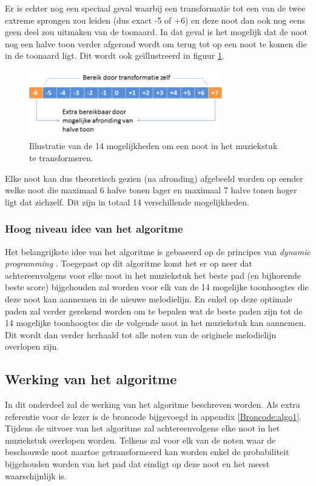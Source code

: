 Er is echter nog een speciaal geval waarbij een transformatie tot een van de twee extreme sprongen zou leiden (dus exact -5 of +6) en deze noot dan ook nog eens geen deel zou uitmaken van de toonaard. In dat geval is het mogelijk dat de noot nog een halve toon verder afgerond wordt om terug tot op een noot te komen die in de toonaard ligt. Dit wordt ook ge\"illustreerd in figuur \ref{figuur:14}.

\begin{figure}[!ht]
  \centering
  \includegraphics[width=0.75\textwidth]{4_Efficient_Toepassen_Transformatie/14}
  \caption{Illustratie van de 14 mogelijkheden om een noot in het muziekstuk te transformeren.}
  \label{figuur:14}
\end{figure}

Elke noot kan dus theoretisch gezien (na afronding) afgebeeld worden op eender welke noot die maximaal 6 halve tonen lager en maximaal 7 halve tonen hoger ligt dat zichzelf. Dit zijn in totaal 14 verschillende mogelijkheden.

\subsubsection{Hoog niveau idee van het algoritme}
Het belangrijkste idee van het algoritme is gebaseerd op de principes van \textit{dynamic programming} \cite{url:DP}. Toegepast op dit algoritme komt het er op neer dat achtereenvolgens voor elke noot in het muziekstuk het beste pad (en bijhorende beste score) bijgehouden zal worden voor elk van de 14 mogelijke toonhoogtes die deze noot kan aannemen in de nieuwe melodielijn. En enkel op deze optimale paden zal verder gerekend worden om te bepalen wat de beste paden zijn tot de 14 mogelijke toonhoogtes die de volgende noot in het muziekstuk kan aannemen. Dit wordt dan verder herhaald tot alle noten van de originele melodielijn overlopen zijn.

\subsection{Werking van het algoritme}
In dit onderdeel zal de werking van het algoritme beschreven worden. Als extra referentie voor de lezer is de broncode bijgevoegd in appendix \ref{Broncode:algo1}. Tijdens de uitvoer van het algoritme zal achtereenvolgens elke noot in het muziekstuk overlopen worden. Telkens zal voor elk van de noten waar de beschouwde noot naartoe getransformeerd kan worden enkel de probabiliteit bijgehouden worden van het pad dat eindigt op deze noot en het meest waarschijnlijk is.

